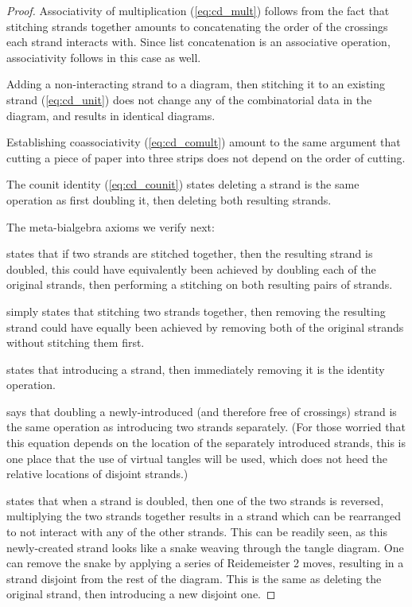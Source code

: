 \begin{proof}
        Associativity of multiplication (\cref{eq:cd_mult}) follows from the
        fact that stitching strands together amounts to concatenating the order
        of the crossings each strand interacts with. Since list concatenation is
        an associative operation, associativity follows in this case as well.

        Adding a non-interacting strand to a diagram, then stitching it to an
        existing strand (\cref{eq:cd_unit}) does not change any of the
        combinatorial data in the diagram, and results in identical diagrams.

        Establishing coassociativity (\cref{eq:cd_comult}) amount to the same
        argument that cutting a piece of paper into three strips does not depend
        on the order of cutting.

        The counit identity (\cref{eq:cd_counit}) states deleting a strand
        is the same operation as first doubling it, then deleting both resulting
        strands.

        The meta-bialgebra axioms we verify next:

         states that if two strands are stitched
        together, then the resulting strand is doubled, this could have
        equivalently been achieved by doubling each of the original strands,
        then performing a stitching on both resulting pairs of strands.

         simply states that stitching two strands
        together, then removing the resulting strand could have equally been
        achieved by removing both of the original strands without stitching them
        first.

         states that introducing a strand, then
        immediately removing it is the identity operation.

         says that doubling a newly-introduced (and
        therefore free of crossings) strand is the same operation as introducing
        two strands separately. (For those worried that this equation depends on
        the location of the separately introduced strands, this is one place
        that the use of virtual tangles will be used, which does not heed the
        relative locations of disjoint strands.)

         states that when a strand is doubled, then one of
        the two strands is reversed, multiplying the two strands together
        results in a strand which can be rearranged to not interact with any of
        the other strands. This can be readily seen, as this newly-created
        strand looks like a snake weaving through the tangle diagram. One can
        remove the snake by applying a series of Reidemeister 2 moves, resulting
        in a strand disjoint from the rest of the diagram. This is the same as
        deleting the original strand, then introducing a new disjoint one.


\end{proof}
